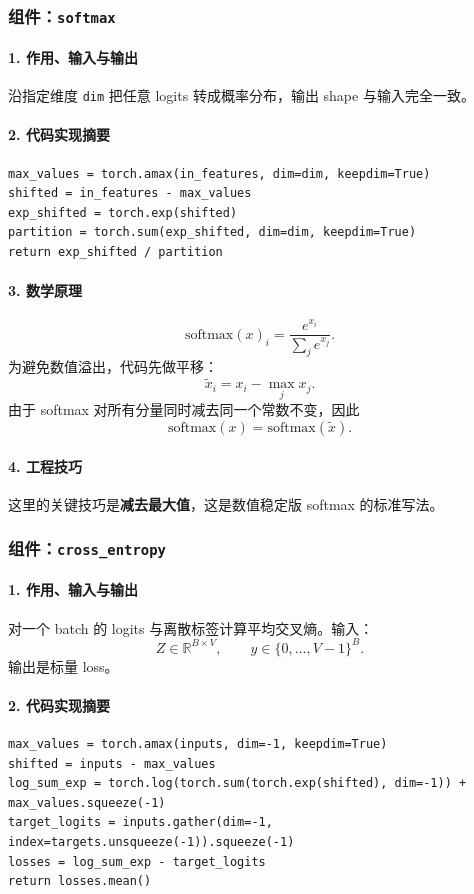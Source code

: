 \documentclass[UTF8,a4paper,11pt]{ctexart}
\begin{document}
\subsubsection{组件：\texttt{softmax}}
\paragraph{1. 作用、输入与输出}
沿指定维度 \texttt{dim} 把任意 logits 转成概率分布，输出 shape 与输入完全一致。

\paragraph{2. 代码实现摘要}
\begin{lstlisting}
max_values = torch.amax(in_features, dim=dim, keepdim=True)
shifted = in_features - max_values
exp_shifted = torch.exp(shifted)
partition = torch.sum(exp_shifted, dim=dim, keepdim=True)
return exp_shifted / partition
\end{lstlisting}

\paragraph{3. 数学原理}
\[
\mathrm{softmax}(x)_i = \frac{e^{x_i}}{\sum_j e^{x_j}}.
\]
为避免数值溢出，代码先做平移：
\[
\tilde{x}_i = x_i - \max_j x_j.
\]
由于 softmax 对所有分量同时减去同一个常数不变，因此
\[
\mathrm{softmax}(x)=\mathrm{softmax}(\tilde{x}).
\]

\paragraph{4. 工程技巧}
这里的关键技巧是\textbf{减去最大值}，这是数值稳定版 softmax 的标准写法。

\subsubsection{组件：\texttt{cross\_entropy}}
\paragraph{1. 作用、输入与输出}
对一个 batch 的 logits 与离散标签计算平均交叉熵。输入：
\[
Z \in \mathbb{R}^{B \times V}, \qquad y \in \{0,\dots,V-1\}^B.
\]
输出是标量 loss。

\paragraph{2. 代码实现摘要}
\begin{lstlisting}
max_values = torch.amax(inputs, dim=-1, keepdim=True)
shifted = inputs - max_values
log_sum_exp = torch.log(torch.sum(torch.exp(shifted), dim=-1)) + max_values.squeeze(-1)
target_logits = inputs.gather(dim=-1, index=targets.unsqueeze(-1)).squeeze(-1)
losses = log_sum_exp - target_logits
return losses.mean()
\end{lstlisting}
\end{document}
